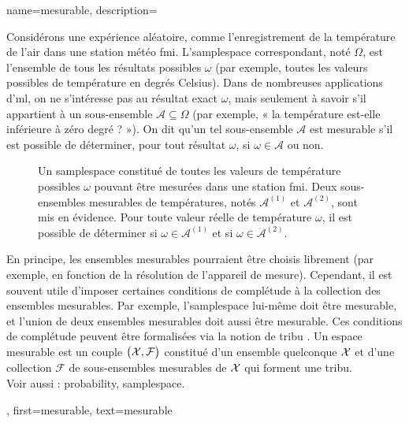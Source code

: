 {name={mesurable}, 
	description={
		Considérons une expérience aléatoire, comme l’enregistrement de la température de l’air dans une station météo \gls{fmi}. 
		L'\gls{samplespace} correspondant, noté $\Omega$, est l’ensemble de tous les résultats possibles $\omega$ (par exemple, toutes les valeurs possibles de température en degrés Celsius). 
		Dans de nombreuses applications d’\gls{ml}, on ne s’intéresse pas au résultat exact $\omega$, mais seulement à savoir s’il appartient à un sous-ensemble $\mathcal{A} \subseteq \Omega$ 
		(par exemple, « la température est-elle inférieure à zéro degré ? »). On dit qu’un tel sous-ensemble $\mathcal{A}$ est mesurable s’il est possible de déterminer, pour tout résultat $\omega$, si $\omega \in \mathcal{A}$ ou non. 
		\begin{figure}
			\vspace*{10mm}
			\caption{Un \gls{samplespace} constitué de toutes les valeurs de température possibles $\omega$ 
				pouvant être mesurées dans une station \gls{fmi}. Deux sous-ensembles mesurables de températures, notés $\mathcal{A}^{(1)}$ et $\mathcal{A}^{(2)}$, sont mis en évidence. 
				Pour toute valeur réelle de température $\omega$, il est possible de déterminer si $\omega \in \mathcal{A}^{(1)}$ et si $\omega \in \mathcal{A}^{(2)}$.
			} 
		\end{figure}
		En principe, les ensembles mesurables pourraient être choisis librement (par exemple, en fonction de la résolution de l’appareil de mesure). 
		Cependant, il est souvent utile d’imposer certaines conditions de complétude à la collection des ensembles mesurables. Par exemple, l'\gls{samplespace} lui-même doit être mesurable, 
		et l’union de deux ensembles mesurables doit aussi être mesurable. Ces conditions de complétude peuvent être formalisées via la notion de tribu \cite{BillingsleyProbMeasure,durrett2010probability,rudin1987real}. 
		Un espace mesurable est un couple $\big(\mathcal{X},\mathcal{F}\big)$ constitué d’un ensemble quelconque $\mathcal{X}$ et d’une collection $\mathcal{F}$ de sous-ensembles mesurables de $\mathcal{X}$ qui forment une tribu. 
		\\
		Voir aussi : \gls{probability}, \gls{samplespace}.},
	first={mesurable},
	text={mesurable} 
}

